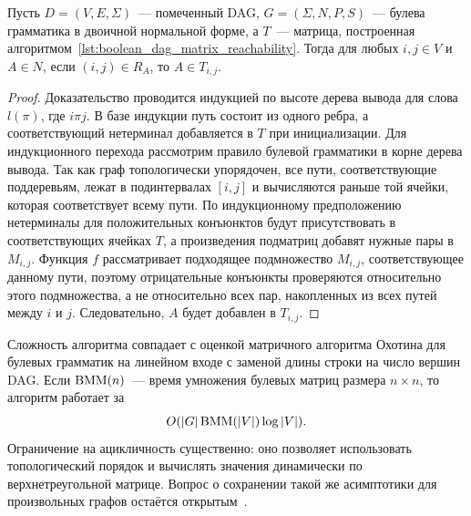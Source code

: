 \begin{theorem}
    Пусть $D = (V,E,\Sigma)$~--- помеченный DAG, $G = (\Sigma,N,P,S)$~--- булева грамматика в двоичной нормальной форме, а $T$~--- матрица, построенная алгоритмом~\ref{lst:boolean_dag_matrix_reachability}. Тогда для любых $i,j \in V$ и $A \in N$, если $(i,j) \in R_A$, то $A \in T_{i,j}$.
\end{theorem}

\begin{proof}
    Доказательство проводится индукцией по высоте дерева вывода для слова $l(\pi)$, где $i \pi j$. В базе индукции путь состоит из одного ребра, а соответствующий нетерминал добавляется в $T$ при инициализации. Для индукционного перехода рассмотрим правило булевой грамматики в корне дерева вывода. Так как граф топологически упорядочен, все пути, соответствующие поддеревьям, лежат в подинтервалах $[i,j]$ и вычисляются раньше той ячейки, которая соответствует всему пути. По индукционному предположению нетерминалы для положительных конъюнктов будут присутствовать в соответствующих ячейках $T$, а произведения подматриц добавят нужные пары в $M_{i,j}$. Функция $f$ рассматривает подходящее подмножество $M_{i,j}$, соответствующее данному пути, поэтому отрицательные конъюнкты проверяются относительно этого подмножества, а не относительно всех пар, накопленных из всех путей между $i$ и $j$. Следовательно, $A$ будет добавлен в $T_{i,j}$.
\end{proof}

Сложность алгоритма совпадает с оценкой матричного алгоритма Охотина для булевых грамматик на линейном входе с заменой длины строки на число вершин DAG. Если $\operatorname{BMM}(n)$~--- время умножения булевых матриц размера $n \times n$, то алгоритм работает за
\[
    O(|G|\operatorname{BMM}(|V|)\log |V|).
\]
Ограничение на ацикличность существенно: оно позволяет использовать топологический порядок и вычислять значения динамически по верхнетреугольной матрице. Вопрос о сохранении такой же асимптотики для произвольных графов остаётся открытым~.
